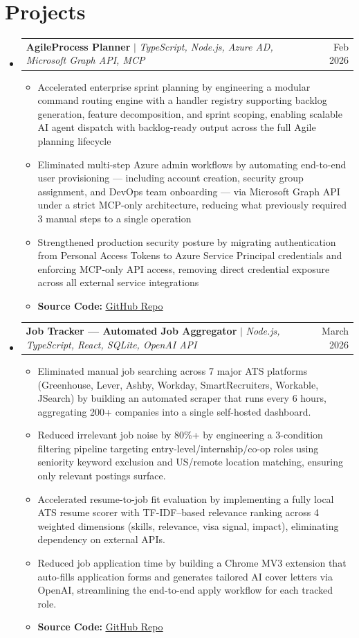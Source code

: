 \documentclass[letterpaper,10pt]{article}
\makeatletter
\newcommand{\resumeItem}[1]{
  \item\small{
    {#1 \vspace{-2pt}}
  }
}
\newcommand{\resumeProjectHeading}[2]{
    \item
    \begin{tabular*}{0.97\textwidth}{l@{\extracolsep{\fill}}r}
      \small#1 & #2 \\
    \end{tabular*}\vspace{-7pt}
}
\newcommand{\resumeSubHeadingListStart}{\begin{itemize}[leftmargin=0.15in, label={}]}
\newcommand{\resumeSubHeadingListEnd}{\end{itemize}}
\newcommand{\resumeItemListStart}{\begin{itemize}}
\newcommand{\resumeItemListEnd}{\end{itemize}\vspace{-5pt}}
\makeatother
\begin{document}
\section{Projects}
    \resumeSubHeadingListStart
      \resumeProjectHeading
          {\textbf{AgileProcess Planner} $|$ \emph{TypeScript, Node.js, Azure AD, Microsoft Graph API, MCP}}{Feb 2026}
          \resumeItemListStart
            \resumeItem{Accelerated enterprise sprint planning by engineering a modular command routing engine with a handler registry supporting backlog generation, feature decomposition, and sprint scoping, enabling scalable AI agent dispatch with backlog-ready output across the full Agile planning lifecycle}
            \resumeItem{Eliminated multi-step Azure admin workflows by automating end-to-end user provisioning — including account creation, security group assignment, and DevOps team onboarding — via Microsoft Graph API under a strict MCP-only architecture, reducing what previously required 3 manual steps to a single operation}
            \resumeItem{Strengthened production security posture by migrating authentication from Personal Access Tokens to Azure Service Principal credentials and enforcing MCP-only API access, removing direct credential exposure across all external service integrations}
            \resumeItem{\textbf{Source Code:} \href{https://github.com/workasaservice/agileprocess-planner}{\underline{GitHub Repo}}}
\resumeItemListEnd
      \resumeProjectHeading
            {\textbf{Job Tracker — Automated Job Aggregator} $|$ \emph{Node.js, TypeScript, React, SQLite, OpenAI API}}{March 2026}
          \resumeItemListStart
            \resumeItem{Eliminated manual job searching across 7 major ATS platforms (Greenhouse, Lever, Ashby, Workday, SmartRecruiters, Workable, JSearch) by building an automated scraper that runs every 6 hours, aggregating 200+ companies into a single self-hosted dashboard.}
            \resumeItem{Reduced irrelevant job noise by 80\%+ by engineering a 3-condition filtering pipeline targeting entry-level/internship/co-op roles using seniority keyword exclusion and US/remote location matching, ensuring only relevant postings surface.}
            \resumeItem{Accelerated resume-to-job fit evaluation by implementing a fully local ATS resume scorer with TF-IDF–based relevance ranking across 4 weighted dimensions (skills, relevance, visa signal, impact), eliminating dependency on external APIs.}
            \resumeItem{Reduced job application time by building a Chrome MV3 extension that auto-fills application forms and generates tailored AI cover letters via OpenAI, streamlining the end-to-end apply workflow for each tracked role.}
            \resumeItem{\textbf{Source Code:} \href{https://github.com/priyabrataunt/job_automation}{\underline{GitHub Repo}}}
          \resumeItemListEnd
    \resumeSubHeadingListEnd
\end{document}
